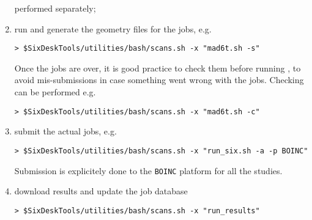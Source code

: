 \begin{enumerate}
performed separately;
\item run \MADX{} and generate the geometry files for the \SIXTRACK{}
  jobs, e.g.
\begin{lstlisting}
> $SixDeskTools/utilities/bash/scans.sh -x "mad6t.sh -s"
\end{lstlisting}
Once the jobs are over, it is good practice to check them before
running \SIXTRACK{}, to avoid mis-submissions in case something
went wrong with the \MADX{} jobs. Checking can be performed e.g.
\begin{lstlisting}
> $SixDeskTools/utilities/bash/scans.sh -x "mad6t.sh -c"
\end{lstlisting}
\item submit the actual \SIXTRACK{} jobs, e.g.
\begin{lstlisting}
> $SixDeskTools/utilities/bash/scans.sh -x "run_six.sh -a -p BOINC"
\end{lstlisting}
Submission is explicitely done to the \texttt{BOINC} platform
for all the studies.
\item download results and update the job database
\begin{lstlisting}
> $SixDeskTools/utilities/bash/scans.sh -x "run_results"
\end{lstlisting}
\end{enumerate}
